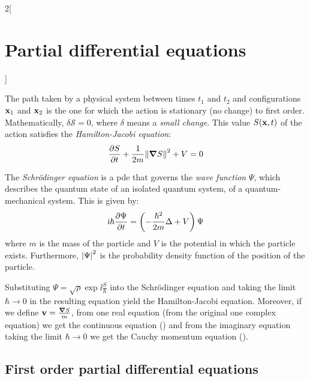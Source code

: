 \documentclass[../../../main_math.tex]{subfiles}
\begin{document}
\begin{multicols}{2}[\section{Partial differential equations}]
  \begin{proposition}
    The path taken by a physical system between times $t_1$ and $t_2$ and configurations $\boldsymbol{\mathrm{x}}_1$ and $\boldsymbol{\mathrm{x}}_2$ is the one for which the action is stationary (no change) to first order. Mathematically, $\delta \mathcal{S}=0$, where $\delta$ means a \emph{small change}. This value $S(\boldsymbol{\mathrm{x}},t)$ of the action satisfies the \emph{Hamilton-Jacobi equation}: $$\pdv{S}{t}+\frac{1}{2m}{\left\|\grad S\right\|}^2+V=0$$
  \end{proposition}
  \begin{proposition}
    The \emph{Schrödinger equation} is a pde that governs the \emph{wave function} $\Psi$, which describes the quantum state of an isolated quantum system, of a quantum-mechanical system. This is given by: $$\mathrm{i} \hbar\pdv{\Psi}{t}=\left(-\frac{\hbar^2}{2m}\Delta+V\right){\Psi}$$ where $m$ is the mass of the particle and $V$ is the potential in which the particle exists. Furthermore, $\abs{\Psi}^2$ is the probability density function of the position of the particle.
  \end{proposition}
  \begin{proposition}
    Substituting ${\Psi}=\sqrt{\rho}\exp{\ii \frac{S}{\hbar}}$ into the Schrödinger equation and taking the limit $\hbar\to 0$ in the resulting equation yield the Hamilton-Jacobi equation. Moreover, if we define $\boldsymbol{\mathrm{v}}=\frac{\grad{S}}{m}$, from one real equation (from the original one complex equation) we get the continuous equation () and from the imaginary equation taking the limit $\hbar\to 0$ we get the Cauchy momentum equation ().
  \end{proposition}
  \subsection{First order partial differential equations}

\end{multicols}
\end{document}
